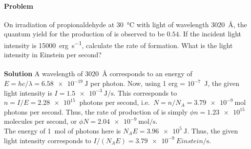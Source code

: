 \documentclass[10pt]{article}
\newcounter{prob}
\def\problem{\stepcounter{prob}\paragraph{Problem \arabic{prob}}}
\def\solution{\\\\\textbf{Solution }}
\begin{document}
        \problem On irradiation of propionaldehyde at \SI{30}{\celsius} with light of wavelength \SI{3020}{\angstrom}, the quantum yield
        for the production of  is observed to be $0.54$. If the incident light intensity is \SI{15000}{erg\per\s},
        calculate the rate of  formation. What is the light intensity in Einstein per second?
        \solution A wavelength of \SI{3020}{\angstrom} corresponds to an energy of $E = hc/\lambda = \SI{6.58e-19}{\joule}$
        per photon. Now, using 1 erg = $10^{-7}$\SI{}{\joule}, the given light intensity is $I = \SI{1.5e-3}{\joule\per\s}$.
        This corresponds to $n = I / E = \SI{2.28e15}{}$ photons per second, i.e.\ $N = n / N_A = \SI{3.79e-9}{\mole}$ photons per second.
        Thus, the rate of production of  is simply $\phi n = \SI{1.23e15}{}$ molecules per second, or $\phi N = \SI{2.04e-9}{\mole\per\s}$. \\

        The energy of \SI{1}{\mol} of photons here is $N_AE = \SI{3.96e5}{\joule}$. Thus, the given light intensity corresponds to
        $I /(N_A E) = \SI{3.79e-9}{Einstein\per\s}$.
\end{document}

